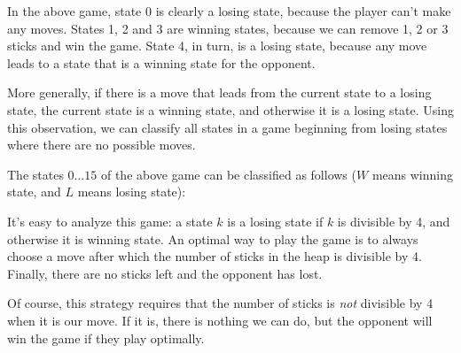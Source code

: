 In the above game, state 0 is clearly a
losing state, because the player can't make
any moves.
States 1, 2 and 3 are winning states,
because we can remove 1, 2 or 3 sticks
and win the game.
State 4, in turn, is a losing state,
because any move leads to a state that
is a winning state for the opponent.

More generally, if there is a move that leads
from the current state to a losing state,
the current state is a winning state,
and otherwise it is a losing state.
Using this observation, we can classify all states
in a game beginning from losing states where
there are no possible moves.

The states $0 \ldots 15$ of the above game
can be classified as follows
($W$ means winning state, and $L$ means losing state):
\begin{center}
\end{center}

It's easy to analyze this game:
a state $k$ is a losing state if $k$ is
divisible by 4, and otherwise it
is winning state.
An optimal way to play the game is
to always choose a move after which
the number of sticks in the heap
is divisible by 4.
Finally, there are no sticks left and
the opponent has lost.

Of course, this strategy requires that
the number of sticks is \emph{not} divisible by 4
when it is our move.
If it is, there is nothing we can do,
but the opponent will win the game if
they play optimally.

